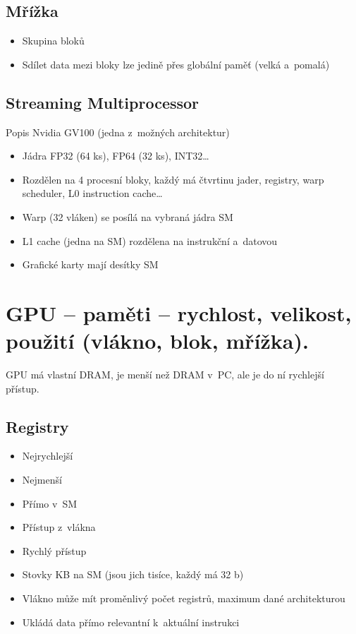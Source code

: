 \subsection{Mřížka}
\begin{itemize}
    \item Skupina bloků
    \item Sdílet data mezi bloky lze jedině přes globální paměť (velká a~pomalá)
\end{itemize}

\subsection{Streaming Multiprocessor}
Popis Nvidia GV100 (jedna z~možných architektur)
\begin{itemize}
    \item Jádra FP32 (64 ks), FP64 (32 ks), INT32\dots
    \item Rozdělen na 4 procesní bloky, každý má čtvrtinu jader, registry, warp scheduler, L0 instruction cache\dots
    \item Warp (32 vláken) se posílá na vybraná jádra SM
    \item L1 cache (jedna na SM) rozdělena na instrukční a~datovou
    \item Grafické karty mají desítky SM
\end{itemize}

\section{GPU – paměti – rychlost, velikost, použití (vlákno, blok, mřížka).}
GPU má vlastní DRAM, je menší než DRAM v~PC, ale je do ní rychlejší přístup.

\subsection{Registry}
\begin{itemize}
    \item Nejrychlejší
    \item Nejmenší
    \item Přímo v~SM
    \item Přístup z~vlákna
    \item Rychlý přístup
    \item Stovky KB na SM (jsou jich tisíce, každý má 32 b)
    \item Vlákno může mít proměnlivý počet registrů, maximum dané architekturou
    \item Ukládá data přímo relevantní k~aktuální instrukci
\end{itemize}


